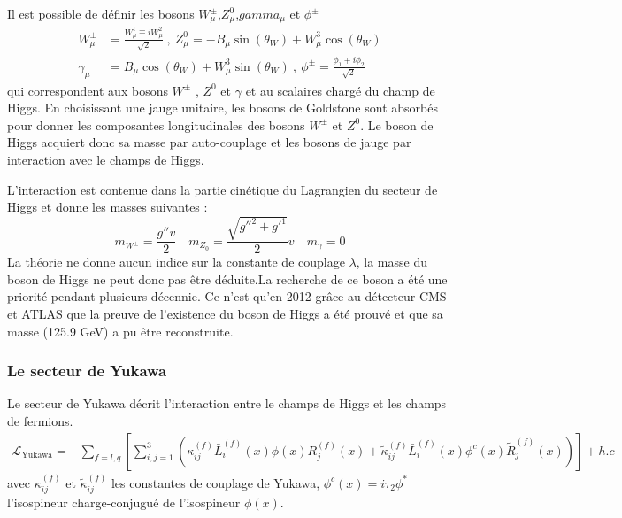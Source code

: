 Il est possible de définir les bosons $W_{\mu}^{\pm}$,$Z_{\mu}^{0}$,$gamma_{\mu}$ et $\phi^{\pm}$ 
\begin{equation}
\begin{split}
W_{\mu}^{\pm}&=\frac{W_{\mu}^{1}\mp iW_{\mu}^{2}}{\sqrt{2}}\ , \ Z_{\mu}^{0}=-B_{\mu}\sin(\theta_{W})+W_{\mu}^{3}\cos(\theta_{W})\\
\gamma_{\mu}&=B_{\mu}\cos(\theta_{W})+W_{\mu}^{3}\sin(\theta_{W})\ , \ \phi^{\pm}=\frac{\phi_{1}\mp i\phi_{2}}{\sqrt{2}}
\end{split}
\end{equation}
qui correspondent aux bosons $W^{\pm}$ , $Z^{0}$ et $\gamma$ et au scalaires chargé du champ de Higgs. En choisissant une jauge unitaire, les bosons de Goldstone sont absorbés pour donner les composantes longitudinales des bosons $W^{\pm}$ et $Z^{0}$. Le boson de Higgs acquiert donc sa masse par auto-couplage et les bosons de jauge par interaction avec le champs de Higgs.

L'interaction est contenue dans la partie cinétique du Lagrangien du secteur de Higgs et donne les masses suivantes : 
\begin{equation}
m_{W^{\pm}}=\frac{g''v}{2} \quad m_{Z_{0}}=\frac{\sqrt{g''^{2}+g'^{1}}}{2}v \quad m_{\gamma}=0 
\end{equation} 
La théorie ne donne aucun indice sur la constante de couplage $\lambda$, la masse du boson de Higgs ne peut donc pas être déduite.La recherche de ce boson a été une priorité pendant plusieurs décennie. Ce n'est qu'en 2012 grâce au détecteur CMS et ATLAS que la preuve de l'existence du boson de Higgs a été prouvé et que sa masse (125.9 GeV) a pu être reconstruite. 

\subsubsection{Le secteur de Yukawa}
Le secteur de Yukawa décrit l'interaction entre le champs de Higgs et les champs de fermions.
\begin{equation}
\begin{split}
\mathcal{L}_{\mathrm{Yukawa}}=-\sum_{f=l,q}\left[\sum_{i,j=1}^{3}\left(\kappa_{ij}^{(f)}\bar{L}_{i}^{(f)}(x)\phi(x)R_{j}^{(f)}(x)+\tilde{\kappa}_{ij}^{(f)}\bar{L}_{i}^{(f)}(x)\phi^{c}(x)\tilde{R}_{j}^{(f)}(x)\right)\right]+ h.c
\end{split}
\end{equation} 
avec $\kappa_{ij}^{(f)}$ et $\tilde{\kappa}_{ij}^{(f)}$ les constantes de couplage de Yukawa, $\phi^{c}(x)=i\tau_{2}\phi^{*}$ l'isospineur charge-conjugué de l'isospineur $\phi(x)$.

